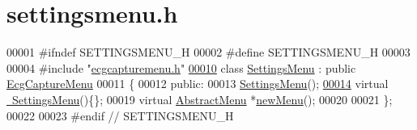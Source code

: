 \hypertarget{settingsmenu_8h_source}{}\section{settingsmenu.\+h}
\label{settingsmenu_8h_source}

\begin{DoxyCode}
00001 \textcolor{preprocessor}{#ifndef SETTINGSMENU\_H}
00002 \textcolor{preprocessor}{#define SETTINGSMENU\_H}
00003 
00004 \textcolor{preprocessor}{#include "\hyperlink{ecgcapturemenu_8h}{ecgcapturemenu.h}"}
\hypertarget{settingsmenu_8h_source.tex_l00010}{}\hyperlink{classSettingsMenu}{00010} \textcolor{keyword}{class }\hyperlink{classSettingsMenu}{SettingsMenu} : \textcolor{keyword}{public} \hyperlink{classEcgCaptureMenu}{EcgCaptureMenu}
00011 \{
00012 \textcolor{keyword}{public}:
00013     \hyperlink{classSettingsMenu_a951edfbd3cf728a1e91887fe08df8d7e}{SettingsMenu}();
\hypertarget{settingsmenu_8h_source.tex_l00014}{}\hyperlink{classSettingsMenu_a02ee4145d9109e70bad37893a88c94c7}{00014}     \textcolor{keyword}{virtual} \hyperlink{classSettingsMenu_a02ee4145d9109e70bad37893a88c94c7}{~SettingsMenu}()\{\};
00019     \textcolor{keyword}{virtual} \hyperlink{classAbstractMenu}{AbstractMenu} *\hyperlink{classSettingsMenu_abc441c12e8044c13f1a99791e2ee30d1}{newMenu}();
00020 
00021 \};
00022 
00023 \textcolor{preprocessor}{#endif // SETTINGSMENU\_H}
\end{DoxyCode}
